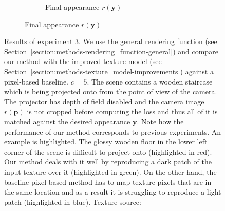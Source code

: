 \begin{figure}[]
\begin{subfigure}{\textwidth}
\begin{subfigure}{0.19\textwidth}
            \caption{Final appearance \(r(\bm{y})\)}
            \vspace*{5.0mm}
            \label{fig:ex03-staircase_illum-beams-pixel_proj}
        \end{subfigure}
    \end{subfigure}
    \caption{Results of experiment 3. We use the general rendering function (see Section~\ref{section:methods-rendering_function-general}) and compare our method with the improved texture model (see Section~\ref{section:methods-texture_model-improvements}) against a pixel-based baseline. \(c = 5\). The scene contains a wooden staircase which is being projected onto from the point of view of the camera. The projector has depth of field disabled and the camera image \(r(\bm{p})\) is not cropped before computing the loss and thus all of it is matched against the desired appearance \(\bm{y}\). Note how the performance of our method corresponds to previous experiments. An example is highlighted. The glossy wooden floor in the lower left corner of the scene is difficult to project onto (highlighted in red). Our method deals with it well by reproducing a dark patch of the input texture over it (highlighted in green). On the other hand, the baseline pixel-based method has to map texture pixels that are in the same location and as a result it is struggling to reproduce a light patch (highlighted in blue). Texture source: \citet{Pixar128}}

\end{figure}
